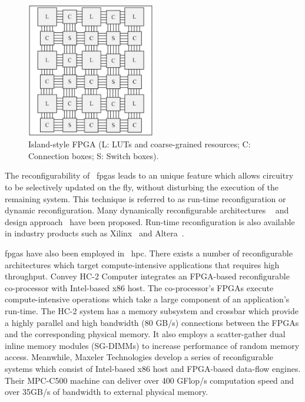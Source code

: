 \begin{figure}[ht]
\begin{center}
\includegraphics[width=0.5\textwidth]{2_background/figures/islandstyle}
\end{center}
\caption{Island-style FPGA (L: LUTs and coarse-grained resources; C: Connection boxes; S: Switch boxes).}
\label{fig:bg_islandstyle}
\end{figure}

The reconfigurability of ~\glspl{fpga} leads to an unique feature which allows circuitry to be selectively updated on the fly, without disturbing the execution of the remaining system.
This technique is referred to as run-time reconfiguration or dynamic reconfiguration.
Many dynamically reconfigurable architectures ~\cite{hauser97,trimberger97,ye00,fujii99} and design approach~\cite{li02,shenoy01,jeong00,li00,noguera01} have been proposed.
Run-time reconfiguration is also available in industry products such as Xilinx~\cite{xilinxdpr} and Altera~\cite{alteradpr}. 

\glspl{fpga} have also been employed in ~\gls{hpc}.
There exists a number of reconfigurable architectures which target compute-intensive applications that requires high throughput.
Convey HC-2 Computer integrates an FPGA-based reconfigurable co-processor with Intel-based x86 host.
The co-processor's FPGAs execute compute-intensive operations which take a large component of an application's run-time.
The HC-2 system has a memory subsystem and crossbar which provide a highly parallel and high bandwidth (80 GB/s) connections between the FPGAs and the corresponding physical memory.
It also employs a scatter-gather dual inline memory modules (SG-DIMMs) to increase performance of random memory access.
Meanwhile, Maxeler Technologies develop a series of reconfigurable systems which consist of Intel-based x86 host and FPGA-based data-flow engines.
Their MPC-C500 machine can deliver over 400 GFlop/s computation speed and over 35GB/s of bandwidth to external physical memory.

